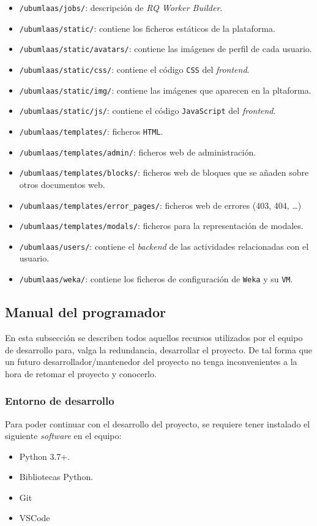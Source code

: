 \begin{itemize}
\item \texttt{/ubumlaas/jobs/}: descripción de \textit{RQ Worker Builder}.
\item \texttt{/ubumlaas/static/}: contiene los ficheros estáticos de la plataforma.
\item \texttt{/ubumlaas/static/avatars/}: contiene las imágenes de perfil de cada usuario.
\item \texttt{/ubumlaas/static/css/}: contiene el código \texttt{CSS} del \textit{frontend}.
\item \texttt{/ubumlaas/static/img/}: contiene las imágenes que aparecen en la pltaforma.
\item \texttt{/ubumlaas/static/js/}: contiene el código \texttt{JavaScript} del \textit{frontend}.
\item \texttt{/ubumlaas/templates/}: ficheros \texttt{HTML}.
\item \texttt{/ubumlaas/templates/admin/}: ficheros web de administración.
\item \texttt{/ubumlaas/templates/blocks/}: ficheros web de bloques que se añaden sobre otros documentos web.
\item \texttt{/ubumlaas/templates/error\_pages/}: ficheros web de errores (403, 404, \dots)
\item \texttt{/ubumlaas/templates/modals/}: ficheros para la representación de modales.
\item \texttt{/ubumlaas/users/}: contiene el \textit{backend} de las actividades relacionadas con el usuario.
\item \texttt{/ubumlaas/weka/}: contiene los ficheros de configuración de \texttt{Weka} y su \texttt{VM}.

\end{itemize}

\subsection{Manual del programador}
En esta subsección se describen todos aquellos recursos utilizados por el equipo de desarrollo para, valga la redundancia, desarrollar el proyecto. De tal forma que un futuro desarrollador/mantenedor del proyecto no tenga inconvenientes a la hora de retomar el proyecto y conocerlo.

\subsubsection{Entorno de desarrollo}
Para poder continuar con el desarrollo del proyecto, se requiere tener instalado el siguiente \textit{software} en el equipo:
\begin{itemize}
\tightlist
\item Python 3.7+.
\item Bibliotecas Python.
\item Git
\item VSCode
\end{itemize}

